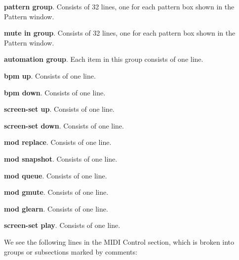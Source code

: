    \begin{enumber}
      \item \textbf{pattern group}.  Consists of 32 lines, one for each
         pattern box shown in the Pattern window.
      \item \textbf{mute in group}.  Consists of 32 lines, one for each
         pattern box shown in the Pattern window.
      \item \textbf{automation group}.  Each item in this group consists of
         one line.
         \begin{enumber}
            \item \textbf{bpm up}. Consists of one line.
            \item \textbf{bpm down}. Consists of one line.
            \item \textbf{screen-set up}. Consists of one line.
            \item \textbf{screen-set down}. Consists of one line.
            \item \textbf{mod replace}. Consists of one line.
            \item \textbf{mod snapshot}. Consists of one line.
            \item \textbf{mod queue}. Consists of one line.
            \item \textbf{mod gmute}. Consists of one line.
            \item \textbf{mod glearn}. Consists of one line.
            \item \textbf{screen-set play}. Consists of one line.
         \end{enumber}
   \end{enumber}

   We see the following lines in the MIDI Control section, which is broken
   into groups or subsections marked by comments:

